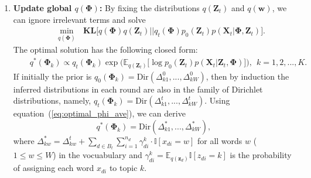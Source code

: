 \documentclass[twoside,11pt]{article}
\newcommand{\Xv}{\bm{X}}
\newcommand{\zv}{\bm{z}}
\newcommand{\Zv}{\bm{Z}}
\newcommand{\wv}{\bm{w}}
\newcommand{\Phiv}{\bm{\Phi}}
\newcommand{\muv}{\bm \mu}
\newcommand{\Sigmav}{\bm \Sigma}
\newcommand{\ep}{\mathbb{E}}
\newcommand{\KL}{\textbf{KL}}
\newcommand\refeq[1]{(\ref{#1})}
\begin{document}
\begin{enumerate}
\item \textbf{Update global $q(\Phiv)$: }  By fixing the distributions $q(\Zv_t)$ and $q(\wv)$, we can ignore irrelevant terms and solve
\setlength\arraycolsep{0 pt}\begin{eqnarray*}
&& \underset{q(\Phiv)}{\operatorname{min}}{~~~\KL\Big[q(\Phiv) q(\Zv_t) || q_t(\Phiv) p_0(\Zv_t) p(\Xv_t | \Phiv, \Zv_t) \Big]}.
\end{eqnarray*}
The optimal solution has the following closed form:
\setlength\arraycolsep{0pt} \begin{eqnarray} \label{eq:optimal_phi_ave}
&& q^*(\bm{\Phi}_k) \propto q_t(\Phiv_k) \exp\Big( \ep_{q(\Zv_t)} \Big[\log p_0(\Zv_t) p(\Xv_t | \Zv_t, \Phiv) \Big]  \Big), ~~  k = 1,2,...,K. %
\end{eqnarray}
If initially the prior is $q_0(\Phiv_k) = \text{Dir}(\Delta_{k1}^{0}, ..., \Delta_{kW}^{0})$, %
then by induction the inferred distributions in each round are also in the family of Dirichlet distributions, namely, $q_t(\Phiv_k) = \text{Dir}(\Delta_{k1}^{t}, ..., \Delta_{kW}^{t})$. %
Using equation~\refeq{eq:optimal_phi_ave}, we can derive
\setlength\arraycolsep{1pt} \begin{equation}\label{eq:lda_phi2}
q^*(\bm{\Phi}_k) = \text{Dir}(\Delta_{k1}^*, ..., \Delta_{kW}^*),
\end{equation}
where $\Delta_{kw}^* = \Delta_{kw}^t + \sum_{d \in B_t}\sum_{i = 1}^{n_d}{ \gamma_{di}^k \cdot \mathbb{I}[x_{di} = w]}$ for all words $w$ ($1 \leq w \leq W$) in the vocuabulary and $\gamma_{di}^k = \ep_{q(\zv_d)} \mathbb{I}[z_{di} = k]$ is the probability of assigning each word $x_{di}$ to topic $k$.


\end{enumerate}
\end{document}
